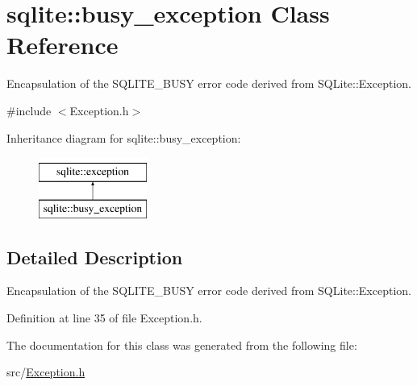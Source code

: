 \hypertarget{a00003}{\section{sqlite\-:\-:busy\-\_\-exception Class Reference}
\label{a00003}
}


Encapsulation of the S\-Q\-L\-I\-T\-E\-\_\-\-B\-U\-S\-Y error code derived from S\-Q\-Lite\-::\-Exception.  




{\ttfamily \#include $<$Exception.\-h$>$}

Inheritance diagram for sqlite\-:\-:busy\-\_\-exception\-:\begin{figure}[H]
\begin{center}
\leavevmode
\includegraphics[height=2.000000cm]{a00003}
\end{center}
\end{figure}


\subsection{Detailed Description}
Encapsulation of the S\-Q\-L\-I\-T\-E\-\_\-\-B\-U\-S\-Y error code derived from S\-Q\-Lite\-::\-Exception. 



Definition at line 35 of file Exception.\-h.



The documentation for this class was generated from the following file\-:\begin{DoxyCompactItemize}
\item 
src/\hyperlink{a00024}{Exception.\-h}\end{DoxyCompactItemize}
